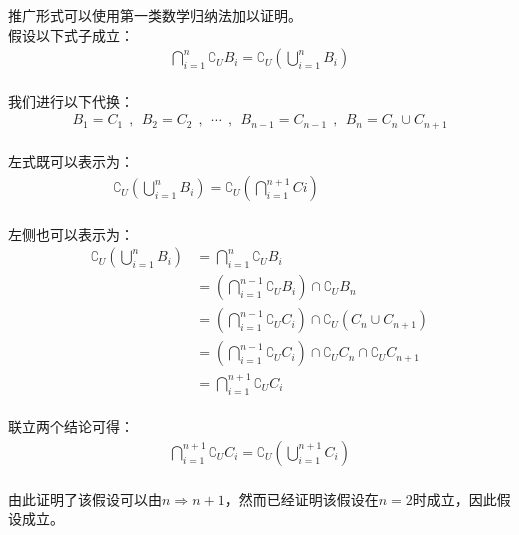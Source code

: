 \documentclass[UTF8]{ctexart}
\begin{document}
    推广形式可以使用第一类数学归纳法加以证明。\\[3mm]
    假设以下式子成立：
    \setcounter{equation}{0}
    \begin{align}
        \bigcap_{i=1}^n \complement_UB_i=\complement_U\left(\bigcup_{i=1}^n B_i\right)
    \end{align}\\
    我们进行以下代换：
    \begin{align}
        B_1=C_1~~,~~B_2=C_2~~,~~\cdots~~,~~B_{n-1}=C_{n-1}~~,~~B_n=C_n\cup C_{n+1}
    \end{align}\\
    左式既可以表示为：
    \begin{align}
        \complement_U\left(\bigcup_{i=1}^n B_i\right)=\complement_U\left(\bigcap_{i=1}^{n+1}Ci\right)~~~~~~~~~~~~~~~~~~~~~~~~~~~~
    \end{align}\\
    左侧也可以表示为：
    \begin{align}
        \complement_U\left(\bigcup_{i=1}^n B_i\right)
        &=\bigcap_{i=1}^n\complement_U B_i\\[3mm]
        &=\left(\bigcap_{i=1}^{n-1}\complement_U B_i\right)\cap\complement_U B_n\\[3mm]
        &=\left(\bigcap_{i=1}^{n-1}\complement_U C_i\right)\cap\complement_U\left(C_n\cup C_{n+1}\right)\\[3mm]
        &=\left(\bigcap_{i=1}^{n-1}\complement_U C_i\right)\cap\complement_UC_n\cap \complement_UC_{n+1}\\[3mm]
        &=\bigcap_{i=1}^{n+1}\complement_U C_i
    \end{align}\\
    联立两个结论可得：
    \begin{align}
        \bigcap_{i=1}^{n+1} \complement_UC_i=\complement_U\left(\bigcup_{i=1}^{n+1} C_i\right)
    \end{align}\\
    由此证明了该假设可以由$n\Rightarrow n+1$，然而已经证明该假设在$n=2$时成立，因此假设成立。

\newpage
\end{document}
